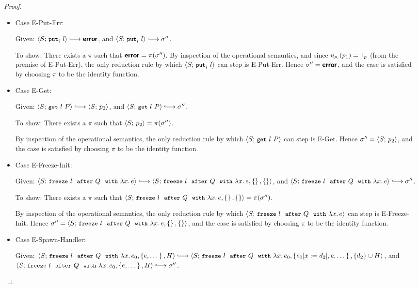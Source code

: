 \begin{proof}
\begin{itemize}
  \item Case {\sc E-Put-Err}:

    Given: $\config{S}{\putiexp{l}} \parstepsto \error$, and
    $\config{S}{\putiexp{l}} \parstepsto \conf''$.

    To show: There exists a $\pi$ such that $\textbf{\textsf{error}} = \pi(\sigma'')$.
    By inspection of the operational semantics, and since
    $u_{p_i}(p_1) = \top\hspace{-0.85mm}_{p}$ (from the premise of {\sc E-Put-Err}), the
    only reduction rule by which $\langle S;\, \mbox{\small{\texttt{put}}}_i~l \rangle$ can step is
    {\sc E-Put-Err}.  Hence $\sigma'' = \textbf{\textsf{error}}$, and the case is
    satisfied by choosing $\pi$ to be the identity function.

  \item Case {\sc E-Get}:

    Given: $\config{S}{\getexp{l}{P}} \parstepsto \config{S}{p_2}$,
    and $\config{S}{\getexp{l}{P}} \parstepsto \conf''$.

    To show: There exists a $\pi$ such that $\langle S;\, p_2 \rangle =
    \pi(\sigma'')$.

    By inspection of the operational semantics, the only reduction
    rule by which $\langle S;\, \mbox{\small{\texttt{get}}}~l~P \rangle$ can step is {\sc E-Get}.
    Hence $\sigma'' = \langle S;\, p_2 \rangle$, and the case is satisfied by
    choosing $\pi$ to be the identity function.

  \item Case {\sc E-Freeze-Init}:

    Given: $\config{S}{\freezeafter{l}{Q}{\lam{x}{e}}} \parstepsto
    \config{S}{\freezeafterfull{l}{Q}{\lam{x}{e}}{\setof{}}{\setof{}}}$,
    and $\config{S}{\freezeafter{l}{Q}{\lam{x}{e}}} \parstepsto \conf''$.

    To show: There exists a $\pi$ such that
    $\langle S;\, \mbox{\small{\texttt{freeze}}}~l~~{\mbox{\small{\texttt{after}}}}~Q~~{\mbox{\small{\texttt{with}}}}~\lambda x.\,e, \left\{\right\}, \left\{\right\} \rangle
    = \pi(\sigma'').$

    By inspection of the operational semantics, the only reduction
    rule by which $\langle S;\, \mbox{\small{\texttt{freeze}}}~l~~{\mbox{\small{\texttt{after}}}}~Q~~{\mbox{\small{\texttt{with}}}}~\lambda x.\,e \rangle$ can
    step is {\sc E-Freeze-Init}.  Hence $\sigma'' =
    \langle S;\, \mbox{\small{\texttt{freeze}}}~l~~{\mbox{\small{\texttt{after}}}}~Q~~{\mbox{\small{\texttt{with}}}}~\lambda x.\,e, \left\{\right\}, \left\{\right\} \rangle$,
    and the case is satisfied by choosing $\pi$ to be the identity
    function.

  \item Case {\sc E-Spawn-Handler}:

    Given: $\config{S}{\freezeafterfull{l}{Q}{\lam{x}{e_0}}{\setof{e,
          \dots}}{H}} \parstepsto
    \config{S}{\freezeafterfull{l}{Q}{\lam{x}{e_0}}{\setof{\subst{e_0}{x}{d_2},
          e, \dots}} {\{d_2\}\cup H}}$, and
    $\config{S}{\freezeafterfull{l}{Q}{\lam{x}{e_0}}{\setof{e,
          \dots}}{H}} \parstepsto \conf''$.


\end{itemize}
\end{proof}
